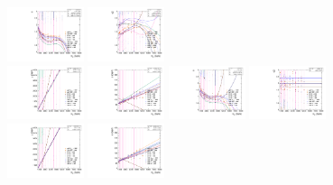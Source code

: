 \begin{figure}[htbp]
  \includegraphics[width=0.2\textwidth]{fig/2Dfit/paramSignalShape_allSig_MVV_LP_nobb_LDy_ALPHA1.pdf}
  \includegraphics[width=0.2\textwidth]{fig/2Dfit/paramSignalShape_allSig_MVV_LP_nobb_LDy_ALPHA2.pdf}\\
  \includegraphics[width=0.2\textwidth]{fig/2Dfit/paramSignalShape_allSig_MVV_HP_vbf_LDy_MEAN.pdf}
  \includegraphics[width=0.2\textwidth]{fig/2Dfit/paramSignalShape_allSig_MVV_HP_vbf_LDy_SIGMA.pdf}
  \includegraphics[width=0.2\textwidth]{fig/2Dfit/paramSignalShape_allSig_MVV_HP_vbf_LDy_ALPHA1.pdf}
  \includegraphics[width=0.2\textwidth]{fig/2Dfit/paramSignalShape_allSig_MVV_HP_vbf_LDy_ALPHA2.pdf}\\
  \includegraphics[width=0.2\textwidth]{fig/2Dfit/paramSignalShape_allSig_MVV_LP_vbf_LDy_MEAN.pdf}
  \includegraphics[width=0.2\textwidth]{fig/2Dfit/paramSignalShape_allSig_MVV_LP_vbf_LDy_SIGMA.pdf}

\end{figure}
